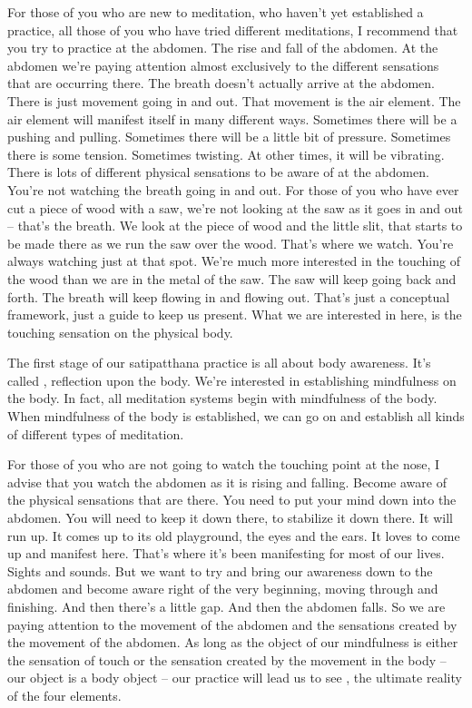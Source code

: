 \documentclass[letterpaper,10pt,english]{sphinxmanual}
\begin{document}
\sphinxAtStartPar
For those of you who are new to meditation, who haven’t yet established  a  practice,  all  those  of  you  who  have  tried  different  meditations,  I
recommend  that  you  try  to  practice  at  the  abdomen.  The  rise  and  fall  of
the abdomen. At the abdomen we’re paying attention almost exclusively to
the different sensations that are occurring there. The breath doesn’t actually
arrive at the abdomen. There is just movement going in and out. That movement is the air element. The air element will manifest itself in many different ways. Sometimes there will be a pushing and pulling. Sometimes there
will be a little bit of pressure. Sometimes there is some tension. Sometimes
  twisting. At other times, it will be vibrating. There is lots of different physical sensations to be aware of at the abdomen. You’re not watching the breath
going in and out. For those of you who have ever cut a piece of wood with a
saw, we’re not looking at the saw as it goes in and out – that’s the breath. We
look at the piece of wood and the little slit, that starts to be made there as we
run the saw over the wood. That’s where we watch. You’re always watching
just  at  that  spot. We’re  much  more  interested  in  the  touching  of  the  wood
than we are in the metal of the saw. The saw will keep going back and forth.
The  breath  will  keep  flowing  in  and  flowing  out.  That’s  just  a  conceptual
framework, just a guide to keep us present. What we are interested in here,
is the touching sensation on the physical body.

\sphinxAtStartPar
The first stage of our satipatthana practice is all about body awareness.
It’s  called
,  reflection  upon  the  body.  We’re  interested  in
establishing mindfulness on the body. In fact, all meditation systems begin
with mindfulness of the body. When mindfulness of the body is established,
we can go on and establish all kinds of different types of meditation.

\sphinxAtStartPar
For those of you who are not going to watch the touching point at the
nose, I advise that you watch the abdomen as it is rising and falling. Become
aware of the physical sensations that are there. You need to put your mind
down  into  the  abdomen. You  will  need  to  keep  it  down  there,  to  stabilize
it  down  there.  It  will  run  up.  It  comes  up  to  its  old  playground,  the  eyes
and the ears. It loves to come up and manifest here. That’s where it’s been
manifesting for most of our lives. Sights and sounds. But we want to try and
bring our awareness down to the abdomen and become aware right of the
very beginning, moving through and finishing. And then there’s a little gap.
And then the abdomen falls. So we are paying attention to the movement of
the abdomen and the sensations created by the movement of the abdomen.
As long as the object of our mindfulness is either the sensation of touch or
the sensation created by the movement in the body – our object is a body
object – our practice will lead us to see
, the ultimate reality of the
four elements.
\end{document}

